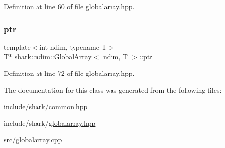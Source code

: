 Definition at line 60 of file globalarray.\+hpp.

\hypertarget{classshark_1_1ndim_1_1_global_array_ad4af3b8307a3a7107186cf699b5a2432}{}\label{classshark_1_1ndim_1_1_global_array_ad4af3b8307a3a7107186cf699b5a2432} 
\subsubsection{\texorpdfstring{ptr}{ptr}}
{\footnotesize\ttfamily template$<$int ndim, typename T$>$ \\
T$\ast$ \hyperlink{classshark_1_1ndim_1_1_global_array}{shark\+::ndim\+::\+Global\+Array}$<$ ndim, T $>$\+::ptr}



Definition at line 72 of file globalarray.\+hpp.



The documentation for this class was generated from the following files\+:\begin{DoxyCompactItemize}
\item 
include/shark/\hyperlink{common_8hpp}{common.\+hpp}\item 
include/shark/\hyperlink{globalarray_8hpp}{globalarray.\+hpp}\item 
src/\hyperlink{globalarray_8cpp}{globalarray.\+cpp}\end{DoxyCompactItemize}
